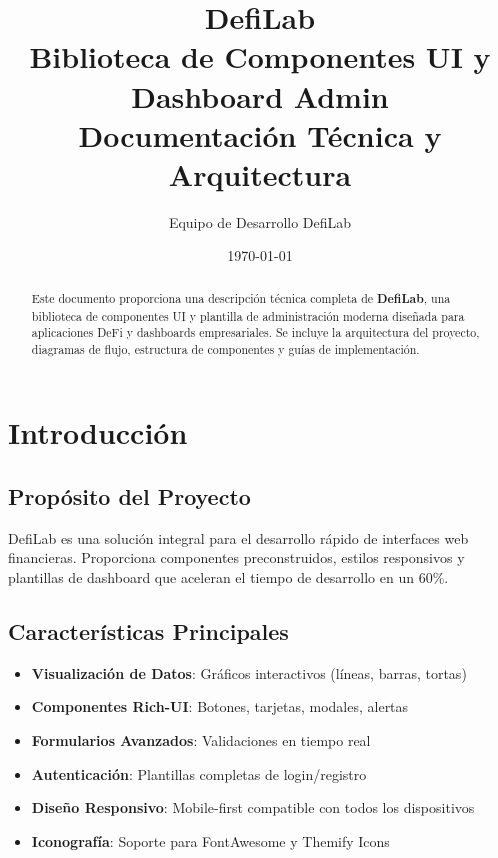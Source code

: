 \documentclass[a4paper,12pt]{article}
\title{\textbf{\Huge DefiLab}\\[0.5cm]
\Large Biblioteca de Componentes UI y Dashboard Admin\\[0.3cm]
\large Documentación Técnica y Arquitectura}
\author{Equipo de Desarrollo DefiLab}
\date{\today}
\begin{document}
\maketitle

\begin{abstract}
\noindent Este documento proporciona una descripción técnica completa de \textbf{DefiLab}, una biblioteca de componentes UI y plantilla de administración moderna diseñada para aplicaciones DeFi y dashboards empresariales. Se incluye la arquitectura del proyecto, diagramas de flujo, estructura de componentes y guías de implementación.
\end{abstract}

\tableofcontents
\newpage

\section{Introducción}

\subsection{Propósito del Proyecto}
DefiLab es una solución integral para el desarrollo rápido de interfaces web financieras. Proporciona componentes preconstruidos, estilos responsivos y plantillas de dashboard que aceleran el tiempo de desarrollo en un 60\%.

\subsection{Características Principales}
\begin{itemize}
    \item \textbf{Visualización de Datos}: Gráficos interactivos (líneas, barras, tortas)
    \item \textbf{Componentes Rich-UI}: Botones, tarjetas, modales, alertas
    \item \textbf{Formularios Avanzados}: Validaciones en tiempo real
    \item \textbf{Autenticación}: Plantillas completas de login/registro
    \item \textbf{Diseño Responsivo}: Mobile-first compatible con todos los dispositivos
    \item \textbf{Iconografía}: Soporte para FontAwesome y Themify Icons
\end{itemize}
\end{document}
